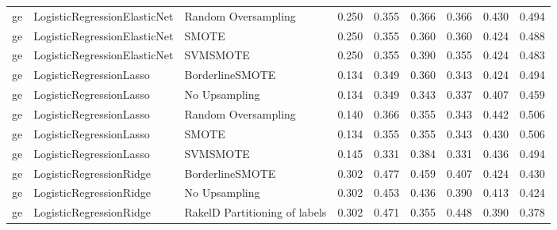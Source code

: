 \begin{tabular}{lllllllll}
      ge &    LogisticRegressionElasticNet &           Random Oversampling & 0.250 &                     0.355 &                 0.366 &                  0.366 &                                   0.430 &     0.494 \\
      ge &    LogisticRegressionElasticNet &                         SMOTE & 0.250 &                     0.355 &                 0.360 &                  0.360 &                                   0.424 &     0.488 \\
      ge &    LogisticRegressionElasticNet &                      SVMSMOTE & 0.250 &                     0.355 &                 0.390 &                  0.355 &                                   0.424 &     0.483 \\
      ge &         LogisticRegressionLasso &               BorderlineSMOTE & 0.134 &                     0.349 &                 0.360 &                  0.343 &                                   0.424 &     0.494 \\
      ge &         LogisticRegressionLasso &                 No Upsampling & 0.134 &                     0.349 &                 0.343 &                  0.337 &                                   0.407 &     0.459 \\
      ge &         LogisticRegressionLasso &           Random Oversampling & 0.140 &                     0.366 &                 0.355 &                  0.343 &                                   0.442 &     0.506 \\
      ge &         LogisticRegressionLasso &                         SMOTE & 0.134 &                     0.355 &                 0.355 &                  0.343 &                                   0.430 &     0.506 \\
      ge &         LogisticRegressionLasso &                      SVMSMOTE & 0.145 &                     0.331 &                 0.384 &                  0.331 &                                   0.436 &     0.494 \\
      ge &         LogisticRegressionRidge &               BorderlineSMOTE & 0.302 &                     0.477 &                 0.459 &                  0.407 &                                   0.424 &     0.430 \\
      ge &         LogisticRegressionRidge &                 No Upsampling & 0.302 &                     0.453 &                 0.436 &                  0.390 &                                   0.413 &     0.424 \\
      ge &         LogisticRegressionRidge & RakelD Partitioning of labels & 0.302 &                     0.471 &                 0.355 &                  0.448 &                                   0.390 &     0.378 \\

\end{tabular}
